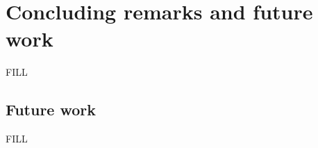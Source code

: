 \chapter{Concluding remarks and future work}
\label{sec:conclusion}
FILL

\section{Future work}
FILL